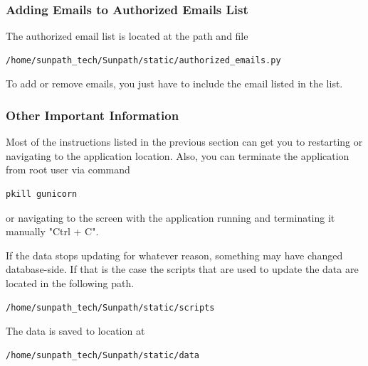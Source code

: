 \documentclass[titlepage]{article}
\begin{document}
\subsubsection{Adding Emails to Authorized Emails List}
The authorized email list is located at the path and file
\begin{verbatim}
/home/sunpath_tech/Sunpath/static/authorized_emails.py
\end{verbatim}
To add or remove emails, you just have to include the email listed in the list. 

\subsubsection{Other Important Information}
Most of the instructions listed in the previous section can get you to restarting or navigating to the application location. Also, you can terminate the application from root user via command 
\begin{verbatim}
pkill gunicorn
\end{verbatim}
or navigating to the screen with the application running and terminating it manually "Ctrl + C". 

If the data stops updating for whatever reason, something may have changed database-side. If that is the case the scripts that are used to update the data are located in the following path.
\begin{verbatim}
/home/sunpath_tech/Sunpath/static/scripts
\end{verbatim}
The data is saved to location at 
\begin{verbatim}
/home/sunpath_tech/Sunpath/static/data
\end{verbatim}
\end{document}

